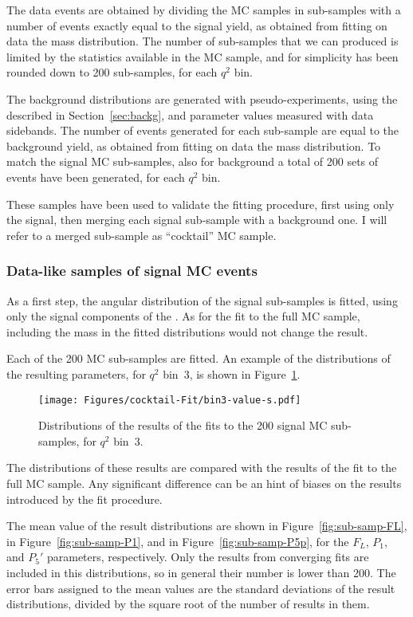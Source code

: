 The data events are obtained by dividing the MC samples in sub-samples with a number of events exactly equal to the signal yield, as obtained from fitting on data the \PBz mass distribution.
The number of sub-samples that we can produced is limited by the statistics available in the MC sample, and for simplicity has been rounded down to 200 sub-samples, for each $q^2$ bin.

The background distributions are generated with pseudo-experiments, using the \pdf described in Section~\ref{sec:backg}, and parameter values measured with data sidebands.
The number of events generated for each sub-sample are equal to the background yield, as obtained from fitting on data the \PBz mass distribution.
To match the signal MC sub-samples, also for background a total of 200 sets of events have been generated, for each $q^2$ bin.

These samples have been used to validate the fitting procedure, first using only the signal, then merging each signal sub-sample with a background one.
I will refer to a merged sub-sample as ``cocktail'' MC sample.

\subsubsection{Data-like samples of signal MC events}
\label{sec:Cocktail-MC-pure}

As a first step, the angular distribution of the signal sub-samples is fitted, using only the signal components of the \pdf.
As for the fit to the full MC sample, including the mass in the fitted distributions would not change the result.

Each of the 200 MC sub-samples are fitted.
An example of the distributions of the resulting parameters, for $q^2$ bin~3, is shown in Figure~\ref{fig:closure-signal-cocktail-bin3}.

\begin{figure}[!hbt]
  \centering
  \texttt{[image: Figures/cocktail-Fit/bin3-value-s.pdf]}
  \caption{Distributions of the results of the fits to the 200 signal MC sub-samples, for $q^2$ bin~3.}
  \label{fig:closure-signal-cocktail-bin3}
\end{figure}

The distributions of these results are compared with the results of the fit to the full MC sample.
Any significant difference can be an hint of biases on the results introduced by the fit procedure.

The mean value of the result distributions are shown in Figure~\ref{fig:sub-samp-FL}, in Figure~\ref{fig:sub-samp-P1}, and in Figure~\ref{fig:sub-samp-P5p}, for the $F_L$, $P_1$, and $P_5'$ parameters, respectively.
Only the results from converging fits are included in this distributions, so in general their number is lower than 200.
The error bars assigned to the mean values are the standard deviations of the result distributions, divided by the square root of the number of results in them. 


